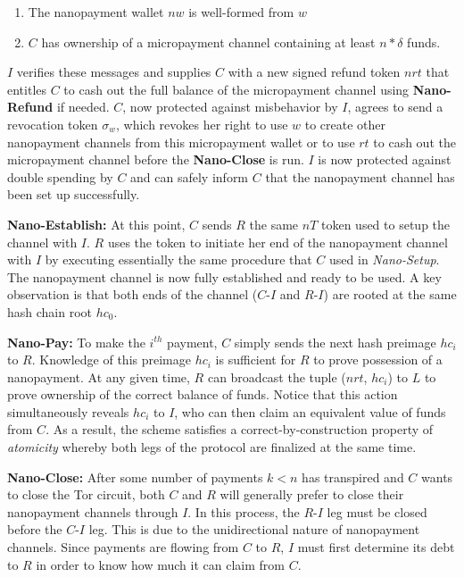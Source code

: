 \begin{enumerate}
\item The nanopayment wallet $nw$ is well-formed from $w$
\item $C$ has ownership of a micropayment channel containing at least $n *
  \delta$ funds.
\end{enumerate}

$I$ verifies these messages and supplies $C$ with a new signed refund token
$nrt$ that entitles $C$ to cash out the full balance of the micropayment channel
using \textbf{Nano-Refund} if needed.
$C$, now protected against misbehavior by $I$, agrees to send a revocation token
$\sigma_w$, which revokes her right to use $w$ to create other nanopayment
channels from this micropayment wallet or to use $rt$ to cash out the
micropayment channel before the \textbf{Nano-Close} is run. $I$ is now protected
against double spending by $C$ and can safely inform $C$ that the nanopayment
channel has been set up successfully.

\medskip
\noindent\textbf{Nano-Establish:} At this point, $C$ sends $R$ the same $nT$ token used to
setup the channel with $I$. $R$ uses the token to initiate her end of the
nanopayment channel with $I$ by executing essentially the same procedure that
$C$ used in \emph{Nano-Setup}. The nanopayment channel is now fully established
and ready to be used. A key observation is that both ends of the channel
($C$-$I$ and $R$-$I$) are rooted at the same hash chain root $hc_0$.

\medskip
\noindent\textbf{Nano-Pay:} To make the $i^{th}$ payment, $C$ simply sends the next
hash preimage $hc_i$ to $R$. Knowledge of this preimage $hc_i$ is sufficient for
$R$ to prove possession of a nanopayment. At any given time, $R$ can broadcast
the tuple ($nrt$, $hc_i$) to $L$ to prove ownership of the correct balance of
funds. Notice that this action simultaneously reveals $hc_i$ to $I$, who can
then claim an equivalent value of funds from $C$. As a result, the scheme
satisfies a correct-by-construction property of \emph{atomicity} whereby both
legs of the protocol are finalized at the same time.

\medskip
\noindent\textbf{Nano-Close:} After some number of payments $k < n$ has transpired and $C$
wants to close the Tor circuit, both $C$ and $R$ will generally prefer to close
their nanopayment channels through $I$. In this process, the $R$-$I$ leg must be
closed before the $C$-$I$ leg. This is due to the unidirectional nature of
nanopayment channels. Since payments are flowing from $C$ to $R$, $I$ must first
determine its debt to $R$ in order to know how much it can claim from $C$.

